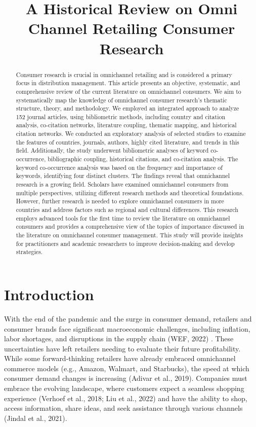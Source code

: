 \documentclass{oscmjournal}
\title{A Historical Review on Omni Channel Retailing Consumer Research}
\begin{document}
\maketitle

\begin{abstract}
    Consumer research is crucial in omnichannel retailing and is considered a primary focus in distribution management. This article presents an objective, systematic, and comprehensive review of the current literature on omnichannel consumers. We aim to systematically map the knowledge of omnichannel consumer research's thematic structure, theory, and methodology. We employed an integrated approach to analyze 152 journal articles, using bibliometric methods, including country and citation analysis, co-citation networks, literature coupling, thematic mapping, and historical citation networks. We conducted an exploratory analysis of selected studies to examine the features of countries, journals, authors, highly cited literature, and trends in this field. Additionally, the study underwent bibliometric analyses of keyword co-occurrence, bibliographic coupling, historical citations, and co-citation analysis. The keyword co-occurrence analysis was based on the frequency and importance of keywords, identifying four distinct clusters. The findings reveal that omnichannel research is a growing field. Scholars have examined omnichannel consumers from multiple perspectives, utilizing different research methods and theoretical foundations. However, further research is needed to explore omnichannel consumers in more countries and address factors such as regional and cultural differences. This research employs advanced tools for the first time to review the literature on omnichannel consumers and provides a comprehensive view of the topics of importance discussed in the literature on omnichannel consumer management. This study will provide insights for practitioners and academic researchers to improve decision-making and develop strategies.
\end{abstract}


\section{Introduction}

With the end of the pandemic and the surge in consumer demand, retailers and consumer brands face significant macroeconomic challenges, including inflation, labor shortages, and disruptions in the supply chain (WEF, 2022) \citep{queiroz2022supply}. These uncertainties have left retailers needing to evaluate their future profitability. While some forward-thinking retailers have already embraced omnichannel commerce models (e.g., Amazon, Walmart, and Starbucks), the speed at which consumer demand changes is increasing (Adivar et al., 2019). Companies must embrace the evolving landscape, where customers expect a seamless shopping experience (Verhoef et al., 2018; Liu et al., 2022) and have the ability to shop, access information, share ideas, and seek assistance through various channels (Jindal et al., 2021).
\end{document}
